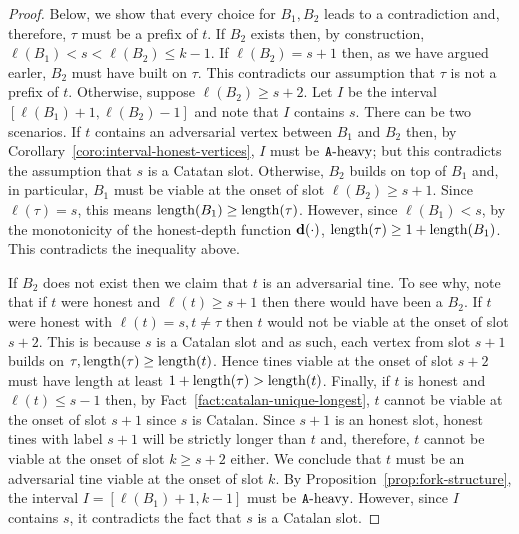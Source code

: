\begin{proof}
    Below, we show that every choice for $B_1, B_2$ leads to a contradiction 
    and, therefore, $\tau$ must be a prefix of $t$. 
    If $B_2$ exists then, 
    by construction, $\ell(B_1) < s < \ell(B_2) \leq k - 1$.
    If $\ell(B_2) = s + 1$ then, as we have argued earler, 
    $B_2$ must have built on $\tau$. 
    This contradicts our assumption that 
    $\tau$ is not a prefix of $t$. 
    Otherwise, suppose $\ell(B_2) \geq s + 2$.  
    Let $I$ be the interval $[\ell(B_1) + 1, \ell(B_2) - 1]$ and note that  
    $I$ contains $s$. 
    There can be two scenarios.
    If $t$ contains an adversarial vertex between $B_1$ and $B_2$ then,  
    by Corollary~\ref{coro:interval-honest-vertices}, 
    $I$ must be $\mathtt{A}\text{-heavy}$; but 
    this contradicts the assumption that $s$ is a Catatan slot. 
    Otherwise,
    $B_2$ builds on top of $B_1$ and, 
    in particular, 
    $B_1$ must be viable at the onset of slot $\ell(B_2) \geq s + 1$. 
    Since $\ell(\tau) = s$, this means $\operatorname{length}(B_1) \geq \operatorname{length}(\tau)$. 
    However, since $\ell(B_1) < s$, 
    by the monotonicity of the honest-depth function $\mathbf{d}(\cdot)$, 
    $\operatorname{length}(\tau) \geq 1 + \operatorname{length}(B_1)$. 
    This contradicts the inequality above.           

    If $B_2$ does not exist then 
    we claim that $t$ is an adversarial tine. 
    To see why, note that if $t$ were honest and $\ell(t) \geq s + 1$ 
    then there would have been a $B_2$. 
    If $t$ were honest with $\ell(t) = s, t \neq \tau$ 
    then $t$ would not be viable at the onset of slot $s + 2$. 
    This is because $s$ is a Catalan slot and as such, 
    each vertex from slot $s + 1$ builds on $\tau, \operatorname{length}(\tau) \geq \operatorname{length}(t)$. 
    Hence tines viable at the onset of slot $s + 2$ must have length at least $1 + \operatorname{length}(\tau) > \operatorname{length}(t)$. 
    Finally, if $t$ is honest and $\ell(t) \leq s - 1$ then, 
    by Fact~\ref{fact:catalan-unique-longest}, 
    $t$ cannot be viable at the onset of slot $s + 1$ 
    since $s$ is Catalan.  
    Since $s + 1$ is an honest slot, 
    honest tines with label $s + 1$ will be strictly longer than $t$ 
    and, therefore, 
    $t$ cannot be viable at the onset of slot $k \geq s + 2$ either. 
    We conclude that $t$ must be an adversarial tine viable at the onset of slot $k$. 
    By Proposition~\ref{prop:fork-structure},       
    the interval $I = [\ell(B_1) + 1, k - 1]$ must be $\mathtt{A}\text{-heavy}$. 
    However, since $I$ contains $s$, it contradicts the fact that $s$ is a Catalan slot.     
  \end{proof}


